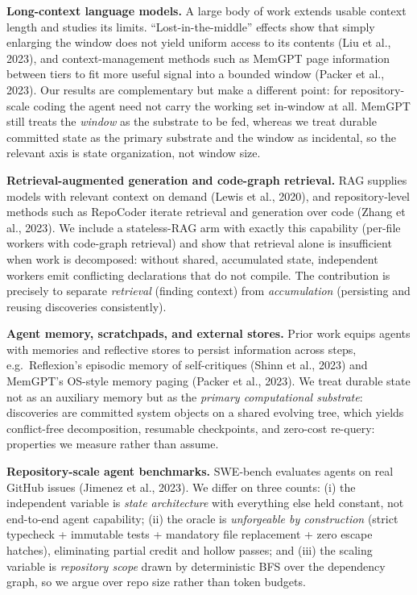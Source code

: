 \documentclass[
  10pt,
]{article}
\begin{document}
\textbf{Long-context language models.} A large body of work extends
usable context length and studies its limits. ``Lost-in-the-middle''
effects show that simply enlarging the window does not yield uniform
access to its contents (Liu et al., 2023), and context-management
methods such as MemGPT page information between tiers to fit more useful
signal into a bounded window (Packer et al., 2023). Our results are
complementary but make a different point: for repository-scale coding
the agent need not carry the working set in-window at all. MemGPT still
treats the \emph{window} as the substrate to be fed, whereas we treat
durable committed state as the primary substrate and the window as
incidental, so the relevant axis is state organization, not window size.

\textbf{Retrieval-augmented generation and code-graph retrieval.} RAG
supplies models with relevant context on demand (Lewis et al., 2020),
and repository-level methods such as RepoCoder iterate retrieval and
generation over code (Zhang et al., 2023). We include a stateless-RAG
arm with exactly this capability (per-file workers with code-graph
retrieval) and show that retrieval alone is insufficient when work is
decomposed: without shared, accumulated state, independent workers emit
conflicting declarations that do not compile. The contribution is
precisely to separate \emph{retrieval} (finding context) from
\emph{accumulation} (persisting and reusing discoveries consistently).

\textbf{Agent memory, scratchpads, and external stores.} Prior work
equips agents with memories and reflective stores to persist information
across steps, e.g.~Reflexion's episodic memory of self-critiques (Shinn
et al., 2023) and MemGPT's OS-style memory paging (Packer et al., 2023).
We treat durable state not as an auxiliary memory but as the
\emph{primary computational substrate}: discoveries are committed system
objects on a shared evolving tree, which yields conflict-free
decomposition, resumable checkpoints, and zero-cost re-query: properties
we measure rather than assume.

\textbf{Repository-scale agent benchmarks.} SWE-bench evaluates agents
on real GitHub issues (Jimenez et al., 2023). We differ on three counts:
(i) the independent variable is \emph{state architecture} with
everything else held constant, not end-to-end agent capability; (ii) the
oracle is \emph{unforgeable by construction} (strict typecheck +
immutable tests + mandatory file replacement + zero escape hatches),
eliminating partial credit and hollow passes; and (iii) the scaling
variable is \emph{repository scope} drawn by deterministic BFS over the
dependency graph, so we argue over repo size rather than token budgets.
\end{document}
